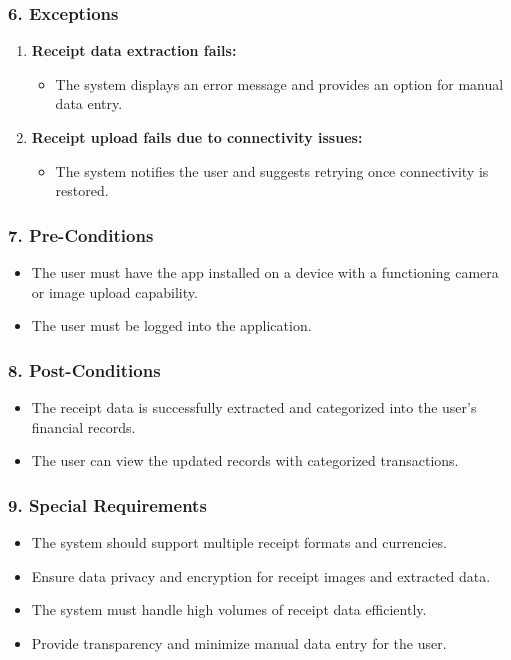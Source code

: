 \subsubsection*{6. Exceptions}
\begin{enumerate}[label=6.\arabic*]
    \item \textbf{Receipt data extraction fails:}
    \begin{itemize}
        \item The system displays an error message and provides an option for manual data entry.
    \end{itemize}
    \item \textbf{Receipt upload fails due to connectivity issues:}
    \begin{itemize}
        \item The system notifies the user and suggests retrying once connectivity is restored.
    \end{itemize}
\end{enumerate}

\subsubsection*{7. Pre-Conditions}
\begin{itemize}
    \item The user must have the app installed on a device with a functioning camera or image upload capability.
    \item The user must be logged into the application.
\end{itemize}

\subsubsection*{8. Post-Conditions}
\begin{itemize}
    \item The receipt data is successfully extracted and categorized into the user's financial records.
    \item The user can view the updated records with categorized transactions.
\end{itemize}

\subsubsection*{9. Special Requirements}
\begin{itemize}
    \item The system should support multiple receipt formats and currencies.
    \item Ensure data privacy and encryption for receipt images and extracted data.
    \item The system must handle high volumes of receipt data efficiently.
    \item Provide transparency and minimize manual data entry for the user.
\end{itemize}

